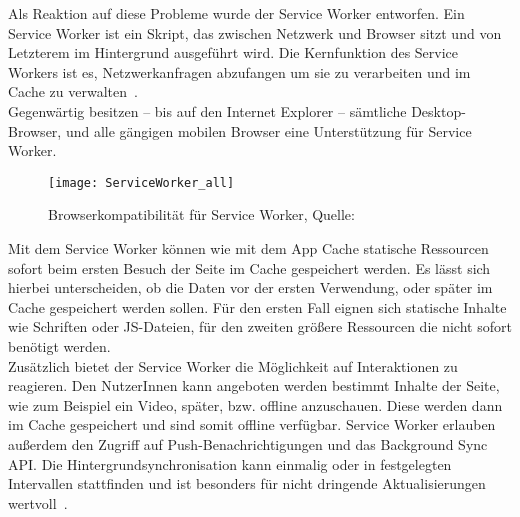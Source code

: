 Als Reaktion auf diese Probleme wurde der Service Worker entworfen.
%
%
Ein Service Worker ist ein Skript, das zwischen Netzwerk und Browser sitzt und von Letzterem im Hintergrund ausgeführt wird. Die Kernfunktion des Service Workers ist es, Netzwerkanfragen abzufangen um sie zu verarbeiten und im Cache zu verwalten~\cite{serviceworker}.\\
Gegenwärtig besitzen -- bis auf den Internet Explorer -- sämtliche Desktop-Browser, und alle gängigen mobilen Browser eine Unterstützung für Service Worker.
\begin{figure}[H]
	\centering
	\texttt{[image: ServiceWorker\_all]}
	\grayRule
	\caption{Browserkompatibilität für Service Worker, Quelle: ~\cite{caniuse-sw}}
	\label{fig:serviceworker}
\end{figure}
Mit dem Service Worker können wie mit dem App Cache statische Ressourcen sofort beim ersten Besuch der Seite im Cache gespeichert werden. Es lässt sich hierbei unterscheiden, ob die Daten vor der ersten Verwendung, oder später im Cache gespeichert werden sollen. Für den ersten Fall eignen sich statische Inhalte wie Schriften oder JS-Dateien, für den zweiten größere Ressourcen die nicht sofort benötigt werden.\\
Zusätzlich bietet der Service Worker die Möglichkeit auf Interaktionen zu reagieren. Den NutzerInnen kann angeboten werden bestimmt Inhalte der Seite, wie zum Beispiel ein Video, später, bzw. offline anzuschauen. Diese werden dann im Cache gespeichert und sind somit offline verfügbar.
Service Worker erlauben außerdem den Zugriff auf Push-Benachrichtigungen und das Background Sync \gls{API}. Die Hintergrundsynchronisation kann einmalig oder in festgelegten Intervallen stattfinden und ist besonders für nicht dringende Aktualisierungen wertvoll~\cite{offline_cookbook}.